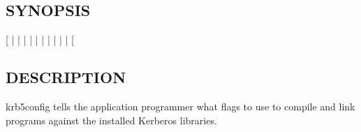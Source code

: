 \documentclass[letterpaper,10pt,english]{sphinxmanual}
\begin{document}
\subsection{SYNOPSIS}
\label{\detokenize{user/user_commands/krb5-config:synopsis}}
\sphinxAtStartPar
{}
{[}\sphinxstylestrong{\sphinxhyphen{}} | \sphinxstylestrong{\sphinxhyphen{}} | \sphinxstylestrong{\sphinxhyphen{}} | \sphinxstylestrong{\sphinxhyphen{}} | \sphinxstylestrong{\sphinxhyphen{}} | \sphinxstylestrong{\sphinxhyphen{}} | \sphinxstylestrong{\sphinxhyphen{}} | \sphinxstylestrong{\sphinxhyphen{}} | \sphinxstylestrong{\sphinxhyphen{}} | \sphinxstylestrong{\sphinxhyphen{}} | \sphinxstylestrong{\sphinxhyphen{}} {[}\sphinxstyleemphasis{libraries}{]}{]}


\subsection{DESCRIPTION}
\label{\detokenize{user/user_commands/krb5-config:description}}
\sphinxAtStartPar
krb5\sphinxhyphen{}config tells the application programmer what flags to use to compile
and link programs against the installed Kerberos libraries.
\end{document}
